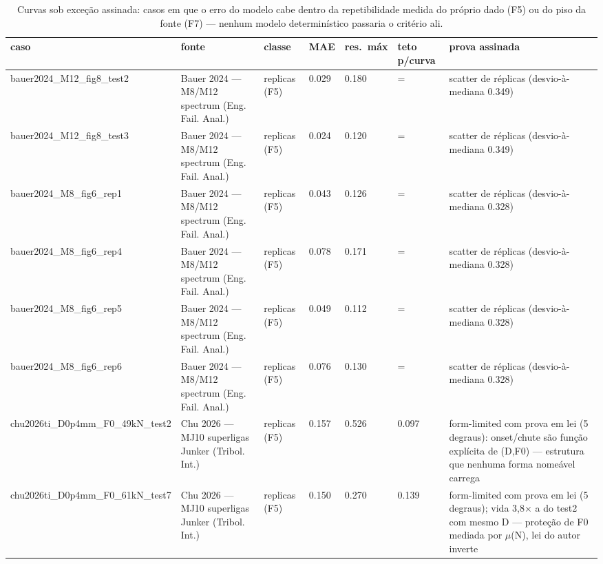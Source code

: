 \begin{table}[t]
\centering
\caption{Curvas sob exce\c{c}\~ao assinada: casos em que o erro do modelo cabe dentro da repetibilidade medida do pr\'oprio dado (F5) ou do piso da fonte (F7) --- nenhum modelo determin\'istico passaria o crit\'erio ali.}
\label{tab:excecoes}
\small
\begin{tabular}{lllllll}
\toprule
caso & fonte & classe & MAE & res.\ m\'ax & teto p/curva & prova assinada \\
\midrule
bauer2024\_M12\_fig8\_test2 & Bauer 2024 — M8/M12 spectrum (Eng. Fail. Anal.) & replicas (F5) & 0.029 & 0.180 & = & scatter de réplicas (desvio-à-mediana 0.349) \\
bauer2024\_M12\_fig8\_test3 & Bauer 2024 — M8/M12 spectrum (Eng. Fail. Anal.) & replicas (F5) & 0.024 & 0.120 & = & scatter de réplicas (desvio-à-mediana 0.349) \\
bauer2024\_M8\_fig6\_rep1 & Bauer 2024 — M8/M12 spectrum (Eng. Fail. Anal.) & replicas (F5) & 0.043 & 0.126 & = & scatter de réplicas (desvio-à-mediana 0.328) \\
bauer2024\_M8\_fig6\_rep4 & Bauer 2024 — M8/M12 spectrum (Eng. Fail. Anal.) & replicas (F5) & 0.078 & 0.171 & = & scatter de réplicas (desvio-à-mediana 0.328) \\
bauer2024\_M8\_fig6\_rep5 & Bauer 2024 — M8/M12 spectrum (Eng. Fail. Anal.) & replicas (F5) & 0.049 & 0.112 & = & scatter de réplicas (desvio-à-mediana 0.328) \\
bauer2024\_M8\_fig6\_rep6 & Bauer 2024 — M8/M12 spectrum (Eng. Fail. Anal.) & replicas (F5) & 0.076 & 0.130 & = & scatter de réplicas (desvio-à-mediana 0.328) \\
chu2026ti\_D0p4mm\_F0\_49kN\_test2 & Chu 2026 — MJ10 superligas Junker (Tribol. Int.) & replicas (F5) & 0.157 & 0.526 & 0.097 & form-limited com prova em lei (5 degraus): onset/chute são função explícita de (D,F0) — estrutura que nenhuma forma nomeável carrega \\
chu2026ti\_D0p4mm\_F0\_61kN\_test7 & Chu 2026 — MJ10 superligas Junker (Tribol. Int.) & replicas (F5) & 0.150 & 0.270 & 0.139 & form-limited com prova em lei (5 degraus); vida 3,8$\times$ a do test2 com mesmo D — proteção de F0 mediada por $\mu$(N), lei do autor inverte \\

\end{tabular}
\end{table}
